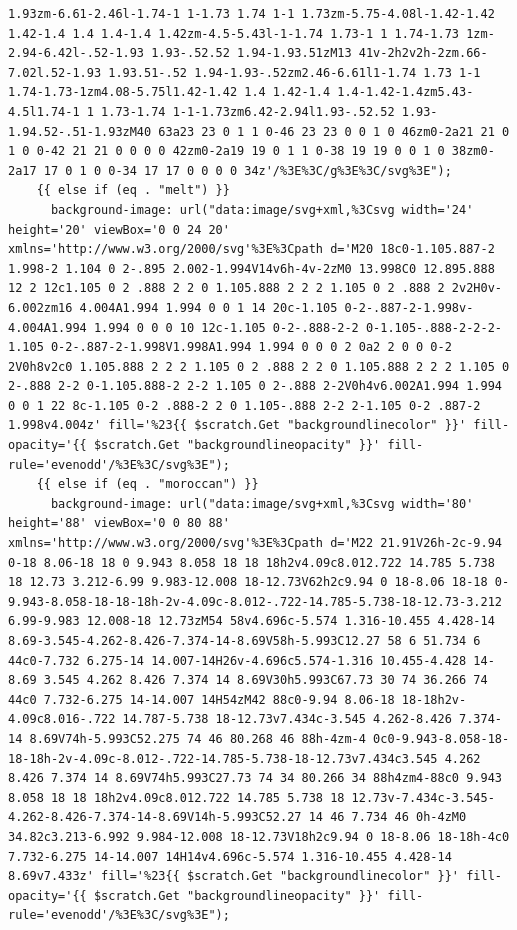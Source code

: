 \documentclass[11pt]{article}
\begin{document}
\begin{enumerate}
\begin{verbatim}
1.93zm-6.61-2.46l-1.74-1 1-1.73 1.74 1-1 1.73zm-5.75-4.08l-1.42-1.42 1.42-1.4 1.4 1.4-1.4 1.42zm-4.5-5.43l-1-1.74 1.73-1 1 1.74-1.73 1zm-2.94-6.42l-.52-1.93 1.93-.52.52 1.94-1.93.51zM13 41v-2h2v2h-2zm.66-7.02l.52-1.93 1.93.51-.52 1.94-1.93-.52zm2.46-6.61l1-1.74 1.73 1-1 1.74-1.73-1zm4.08-5.75l1.42-1.42 1.4 1.42-1.4 1.4-1.42-1.4zm5.43-4.5l1.74-1 1 1.73-1.74 1-1-1.73zm6.42-2.94l1.93-.52.52 1.93-1.94.52-.51-1.93zM40 63a23 23 0 1 1 0-46 23 23 0 0 1 0 46zm0-2a21 21 0 1 0 0-42 21 21 0 0 0 0 42zm0-2a19 19 0 1 1 0-38 19 19 0 0 1 0 38zm0-2a17 17 0 1 0 0-34 17 17 0 0 0 0 34z'/%3E%3C/g%3E%3C/svg%3E");
    {{ else if (eq . "melt") }}
      background-image: url("data:image/svg+xml,%3Csvg width='24' height='20' viewBox='0 0 24 20' xmlns='http://www.w3.org/2000/svg'%3E%3Cpath d='M20 18c0-1.105.887-2 1.998-2 1.104 0 2-.895 2.002-1.994V14v6h-4v-2zM0 13.998C0 12.895.888 12 2 12c1.105 0 2 .888 2 2 0 1.105.888 2 2 2 1.105 0 2 .888 2 2v2H0v-6.002zm16 4.004A1.994 1.994 0 0 1 14 20c-1.105 0-2-.887-2-1.998v-4.004A1.994 1.994 0 0 0 10 12c-1.105 0-2-.888-2-2 0-1.105-.888-2-2-2-1.105 0-2-.887-2-1.998V1.998A1.994 1.994 0 0 0 2 0a2 2 0 0 0-2 2V0h8v2c0 1.105.888 2 2 2 1.105 0 2 .888 2 2 0 1.105.888 2 2 2 1.105 0 2-.888 2-2 0-1.105.888-2 2-2 1.105 0 2-.888 2-2V0h4v6.002A1.994 1.994 0 0 1 22 8c-1.105 0-2 .888-2 2 0 1.105-.888 2-2 2-1.105 0-2 .887-2 1.998v4.004z' fill='%23{{ $scratch.Get "backgroundlinecolor" }}' fill-opacity='{{ $scratch.Get "backgroundlineopacity" }}' fill-rule='evenodd'/%3E%3C/svg%3E");
    {{ else if (eq . "moroccan") }}
      background-image: url("data:image/svg+xml,%3Csvg width='80' height='88' viewBox='0 0 80 88' xmlns='http://www.w3.org/2000/svg'%3E%3Cpath d='M22 21.91V26h-2c-9.94 0-18 8.06-18 18 0 9.943 8.058 18 18 18h2v4.09c8.012.722 14.785 5.738 18 12.73 3.212-6.99 9.983-12.008 18-12.73V62h2c9.94 0 18-8.06 18-18 0-9.943-8.058-18-18-18h-2v-4.09c-8.012-.722-14.785-5.738-18-12.73-3.212 6.99-9.983 12.008-18 12.73zM54 58v4.696c-5.574 1.316-10.455 4.428-14 8.69-3.545-4.262-8.426-7.374-14-8.69V58h-5.993C12.27 58 6 51.734 6 44c0-7.732 6.275-14 14.007-14H26v-4.696c5.574-1.316 10.455-4.428 14-8.69 3.545 4.262 8.426 7.374 14 8.69V30h5.993C67.73 30 74 36.266 74 44c0 7.732-6.275 14-14.007 14H54zM42 88c0-9.94 8.06-18 18-18h2v-4.09c8.016-.722 14.787-5.738 18-12.73v7.434c-3.545 4.262-8.426 7.374-14 8.69V74h-5.993C52.275 74 46 80.268 46 88h-4zm-4 0c0-9.943-8.058-18-18-18h-2v-4.09c-8.012-.722-14.785-5.738-18-12.73v7.434c3.545 4.262 8.426 7.374 14 8.69V74h5.993C27.73 74 34 80.266 34 88h4zm4-88c0 9.943 8.058 18 18 18h2v4.09c8.012.722 14.785 5.738 18 12.73v-7.434c-3.545-4.262-8.426-7.374-14-8.69V14h-5.993C52.27 14 46 7.734 46 0h-4zM0 34.82c3.213-6.992 9.984-12.008 18-12.73V18h2c9.94 0 18-8.06 18-18h-4c0 7.732-6.275 14-14.007 14H14v4.696c-5.574 1.316-10.455 4.428-14 8.69v7.433z' fill='%23{{ $scratch.Get "backgroundlinecolor" }}' fill-opacity='{{ $scratch.Get "backgroundlineopacity" }}' fill-rule='evenodd'/%3E%3C/svg%3E");

\end{verbatim}
\end{enumerate}
\end{document}
